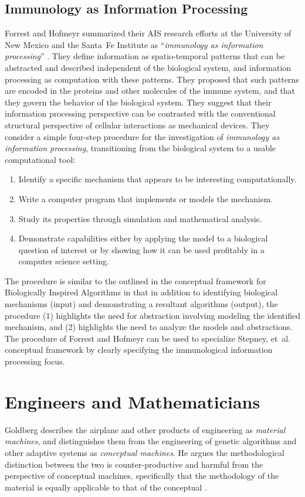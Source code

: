 \documentclass[a4paper, 11pt]{article}
\begin{document}
% 
% 
\subsection{Immunology as Information Processing}
Forrest and Hofmeyr summarized their AIS research efforts at the University of New Mexico and the Santa~Fe Institute as ``\emph{immunology as information processing}'' \cite{Forrest2001}. They define information as spatio-temporal patterns that can be abstracted and described independent of the biological system, and information processing as computation with these patterns. They proposed that such patterns are encoded in the proteins and other molecules of the immune system, and that they govern the behavior of the biological system. They suggest that their information processing perspective can be contrasted with the conventional structural perspective of cellular interactions as mechanical devices. They consider a simple four-step procedure for the investigation of \emph{immunology as information processing}, transitioning from the biological system to a usable computational tool:

\begin{enumerate}
	\item Identify a specific mechanism that appears to be interesting computationally.
	\item Write a computer program that implements or models the mechanism.
	\item Study its properties through simulation and mathematical analysis.
	\item Demonstrate capabilities either by applying the model to a biological question of interest or by showing how it can be used profitably in a computer science setting.
\end{enumerate}

The procedure is similar to the outlined in the conceptual framework for Biologically Inspired Algorithms in that in addition to identifying biological mechanisms (input) and demonstrating a resultant algorithms (output), the procedure (1) highlights the need for abstraction involving modeling the identified mechanism, and (2) highlights the need to analyze the models and abstractions. The procedure of Forrest and Hofmeyr can be used to specialize Stepney, et~al. conceptual framework by clearly specifying the immunological information processing focus.


%
%
\section{Engineers and Mathematicians}
\label{sub:engineers}
Goldberg describes the airplane and other products of engineering as \emph{material machines}, and distinguishes them from the engineering of genetic algorithms and other adaptive systems as \emph{conceptual machines}. He argues the methodological distinction between the two is counter-productive and harmful from the perspective of conceptual machines, specifically that the methodology of the material is equally applicable to that of the conceptual \cite{Goldberg1999a}. 
\end{document}
